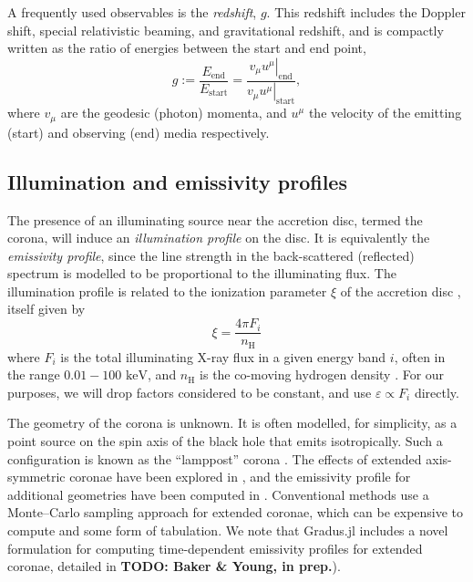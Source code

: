 \documentclass[fleqn,usenatbib]{mnras}
\newcommand{\todo}[1]{{\noindent \bf \color{red} TODO: #1}}
\newcommand{\Gradus}{{\sc Gradus.jl}\xspace}
\begin{document}
A frequently used observables is the \emph{redshift}, $g$. This redshift
includes the Doppler shift, special relativistic beaming, and gravitational
redshift, and is compactly written as the ratio of energies between the start
and end point,
\begin{equation}
\label{eq:redshift}
g := \frac{E_\text{end}}{E_\text{start}} = \frac{\left. v_\mu u^\mu
\right\rvert_\text{end}}{\left. v_\mu u^\mu \right\rvert_{\text{start}}},
\end{equation}
where $v_\mu$ are the geodesic (photon) momenta, and $u^\mu$ the velocity of the
emitting (start) and observing (end) media respectively.



\subsection{Illumination and emissivity profiles}
\label{sec:emissivity-profiles}

The presence of an illuminating source near the accretion disc, termed the
corona\citep{svensson_corona_1994}, will induce an \emph{illumination profile}
on the disc. It is equivalently the \emph{emissivity profile}, since the line
strength in the back-scattered (reflected) spectrum is modelled to be
proportional to the illuminating flux.  The illumination profile is related to
the ionization parameter $\xi$ of the accretion disc
\citep{laor_line_1991,ross_effects_1993,wilkins_understanding_2012}, itself
given by
\begin{equation}
    \xi = \frac{4 \pi F_i}{n_\text{H}}
\end{equation}
where $F_i$ is the total illuminating X-ray flux in a given energy band $i$, often in the range $0.01 - 100
\text{ keV}$, and $n_\text{H}$ is the co-moving hydrogen density
\citep{ross_effects_1993}.
For our purposes, we will drop factors considered to be constant, and use
$\varepsilon \propto F_i$ directly.

The geometry of the corona is unknown. It is often modelled, for simplicity, as
a point source on the spin axis of the black hole that emits isotropically. Such
a configuration is known as the ``lamppost'' corona
\citep[e.g.][]{fukumura_accretion_2007}.  The effects of extended axis-symmetric
coronae have been explored in \citet{wilkins_towards_2016}, and the emissivity
profile for additional geometries have been computed in
\citet{gonzalez_probing_2017}. Conventional methods use a Monte--Carlo sampling
approach for extended coronae, which can be expensive to compute and some form
of tabulation. We note that \Gradus includes a novel formulation for computing
time-dependent emissivity profiles for extended coronae, detailed in \todo{Baker
\& Young, in prep.}).
\end{document}
